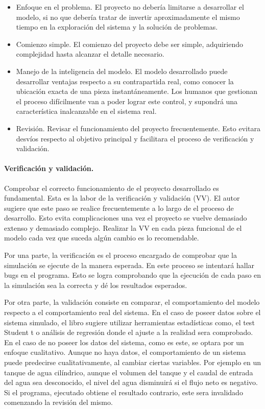 \begin{itemize}
	\item Enfoque en el problema. El proyecto no debería limitarse a desarrollar el modelo,
		si no que debería tratar de invertir aproximadamente el mismo tiempo
		en la exploración del sistema y la solución de problemas.
	\item Comienzo simple. El comienzo del proyecto debe ser simple,
		adquiriendo complejidad hasta alcanzar el detalle necesario.
	\item Manejo de la inteligencia del modelo.
		El modelo desarrollado puede desarrollar ventajas respecto a su contrapartida real,
		como conocer la ubicación exacta de una pieza instantáneamente.
		Los humanos que gestionan el proceso difícilmente van a poder lograr este control,
		y supondrá una característica inalcanzable en el sistema real.
	\item Revisión. Revisar el funcionamiento del proyecto frecuentemente.
		Esto evitara desvíos respecto al objetivo principal
		y facilitara el proceso de verificación y validación.
\end{itemize}
\paragraph{Verificación y validación.}

Comprobar el correcto funcionamiento de el proyecto desarrollado es fundamental.
Esta es la labor de la verificación y validación (VV).
El autor sugiere que este paso se realice
frecuentemente a lo largo de el proceso de desarrollo.
Esto evita complicaciones una vez el proyecto se vuelve demasiado extenso y demasiado complejo.
Realizar la VV en cada pieza funcional de el modelo
cada vez que suceda algún cambio es lo recomendable.

Por una parte, la verificación es el proceso encargado de
comprobar que la simulación se ejecute de la manera esperada.
En este proceso se intentará hallar bugs en el programa.
Esto se logra comprobando que la ejecución de cada paso
en la simulación sea la correcta y dé los resultados esperados.

Por otra parte, la validación consiste en comparar,
el comportamiento del modelo respecto a el comportamiento real del sistema.
En el caso de poseer datos sobre el sistema simulado,
el libro sugiere utilizar herramientas estadísticas como, el test Student t o
análisis de regresión donde el ajuste a la realidad sera comprobado.
En el caso de no poseer los datos del sistema, como es este, se optara por un enfoque cualitativo.
Aunque no haya datos, el comportamiento de un sistema
puede predecirse cualitativamente, al cambiar ciertas variables.
Por ejemplo en un tanque de agua cilíndrico,
aunque el volumen del tanque y el caudal de entrada del agua sea desconocido,
el nivel del agua disminuirá si el flujo neto es negativo.
Si el programa, ejecutado obtiene el resultado contrario,
este sera invalidado comenzando la revisión del mismo.

